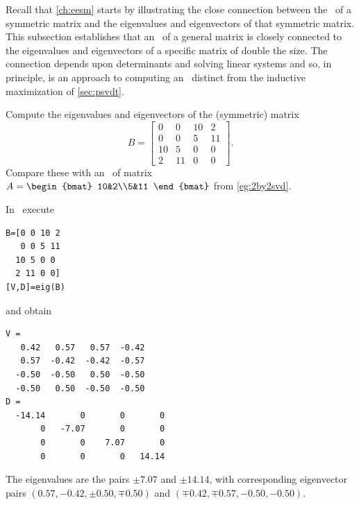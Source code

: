 Recall that \cref{ch:eesm} starts by illustrating the close connection between the \svd\ of a symmetric matrix and the eigenvalues and eigenvectors of that symmetric matrix.
This subsection establishes that an \svd\ of a general matrix is closely connected to the eigenvalues and eigenvectors of a specific matrix of double the size.   
The connection depends upon determinants and solving linear systems and so, in principle, is an approach to computing an \svd\ distinct from the inductive maximization of \cref{sec:psvdt}.



\begin{example} \label{eg:eigsvd}
Compute the eigenvalues and eigenvectors of the (symmetric) matrix
\begin{equation*}
B=\begin{bmatrix} 0&0&10&2\\
0&0&5&11\\
10&5&0&0\\
2&11&0&0 \end{bmatrix}.
\end{equation*}
Compare these with an \svd\ of matrix \(A=\begin{bmat} 10&2\\5&11 \end{bmat}\) from \cref{eg:2by2svd}.
\begin{solution} In \script\ execute
\setbox\ajrqrbox\hbox{}%
\marginajrbox%
\begin{verbatim}
B=[0 0 10 2
   0 0 5 11
  10 5 0 0
  2 11 0 0]
[V,D]=eig(B)
\end{verbatim}
and obtain \twodp
\begin{verbatim}
V =
   0.42   0.57   0.57  -0.42
   0.57  -0.42  -0.42  -0.57
  -0.50  -0.50   0.50  -0.50
  -0.50   0.50  -0.50  -0.50
D =
  -14.14       0       0       0
       0   -7.07       0       0
       0       0    7.07       0
       0       0       0   14.14
\end{verbatim}
The eigenvalues are the pairs \(\pm7.07\) and \(\pm14.14\), with corresponding eigenvector pairs \((0.57,-0.42,\pm0.50,\mp0.50)\) and \((\mp0.42,\mp0.57,-0.50,-0.50)\).



\end{solution}
\end{example}
